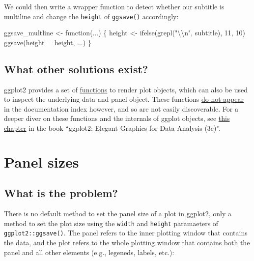 \documentclass[
  letterpaper,
  DIV=11,
  numbers=noendperiod]{scrreprt}
\newenvironment{Shaded}{\begin{snugshade}}{\end{snugshade}}
\newcommand{\AttributeTok}[1]{\textcolor[rgb]{0.40,0.45,0.13}{#1}}
\newcommand{\ControlFlowTok}[1]{\textcolor[rgb]{0.00,0.23,0.31}{#1}}
\newcommand{\DecValTok}[1]{\textcolor[rgb]{0.68,0.00,0.00}{#1}}
\newcommand{\FunctionTok}[1]{\textcolor[rgb]{0.28,0.35,0.67}{#1}}
\newcommand{\NormalTok}[1]{\textcolor[rgb]{0.00,0.23,0.31}{#1}}
\newcommand{\OtherTok}[1]{\textcolor[rgb]{0.00,0.23,0.31}{#1}}
\newcommand{\SpecialCharTok}[1]{\textcolor[rgb]{0.37,0.37,0.37}{#1}}
\newcommand{\StringTok}[1]{\textcolor[rgb]{0.13,0.47,0.30}{#1}}
\begin{document}
We could then write a wrapper function to detect whether our subtitle is
multiline and change the \texttt{height} of \texttt{ggsave()}
accordingly:

\begin{Shaded}
\begin{Highlighting}[]
\NormalTok{ggsave\_multline }\OtherTok{\textless{}{-}} \ControlFlowTok{function}\NormalTok{(...) \{}
\NormalTok{  height }\OtherTok{\textless{}{-}} \FunctionTok{ifelse}\NormalTok{(}\FunctionTok{grepl}\NormalTok{(}\StringTok{"}\SpecialCharTok{\textbackslash{}\textbackslash{}}\StringTok{n"}\NormalTok{, subtitle), }\DecValTok{11}\NormalTok{, }\DecValTok{10}\NormalTok{)}
  \FunctionTok{ggsave}\NormalTok{(}\AttributeTok{height =}\NormalTok{ height, ...)}
\NormalTok{\}}
\end{Highlighting}
\end{Shaded}

\hypertarget{what-other-solutions-exist}{%
\section{What other solutions exist?}\label{what-other-solutions-exist}}

ggplot2 provides a set of
\href{https://ggplot2.tidyverse.org/reference/ggplot_build.html}{functions}
to render plot objects, which can also be used to inspect the underlying
data and panel object. These functions
\href{https://github.com/tidyverse/ggplot2/blob/HEAD/R/plot-build.R\#L21}{do
not appear} in the documentation index however, and so are not easily
discoverable. For a deeper diver on these functions and the internals of
ggplot objects, see \href{https://ggplot2-book.org/internals}{this
chapter} in the book ``ggplot2: Elegant Graphics for Data Analysis
(3e)''.

\hypertarget{panel-sizes}{%
\chapter{Panel sizes}\label{panel-sizes}}

\hypertarget{what-is-the-problem-3}{%
\section{What is the problem?}\label{what-is-the-problem-3}}

There is no default method to set the panel size of a plot in ggplot2,
only a method to set the plot size using the \texttt{width} and
\texttt{height} paramaeters of \texttt{ggplot2::ggsave()}. The panel
refers to the inner plotting window that contains the data, and the plot
refers to the whole plotting window that contains both the panel and all
other elements (e.g., legeneds, labels, etc.):
\end{document}
